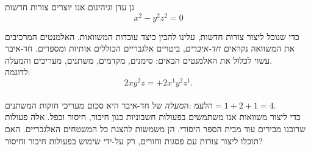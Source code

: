 \begin{surferPage}{גן עדן וגיהינום}
אנו יוצרים צורות חדשות \\
\smallskip
\[x^2	- y^2z^2	= 0\]

\singlespacing
כדי שנוכל ליצור צורות חדשות, עלינו להבין כיצד עובדות המשוואות. האלמנטים המרכיבים את המשוואה נקראים {\it חד-איברים}, ביטויים אלגבריים הכוללים אותיות ומספרים.
\singlespacing
חד-איבר עשוי לכלול את האלמנטים הבאים:
סימנים, מקדמים, משתנים, מעריכים והמעלה.\\
\singlespacing
לדוגמה: 
\smallskip
\[2xy^2z = +2x^1y^2z^1.\]
\\
\smallskip
ה{\it מעלה} של חד-איבר היא סכום מעריכי חזקות המשתנים: $מעלה = 1+2+1=4$.  \\
\singlespacing
כדי ליצור משוואות אנו משתמשים בפעולות חשבוניות כגון חיבור, חיסור וכפל. אלה פעולות שרובנו מכירים עוד מבית הספר היסודי. הן משמשות להצגת כל המשטחים האלגבריים.
\singlespacing
האם תוכלו ליצור צורות עם פסגות וחורים, רק על-ידי שימוש בפעולות חיבור וחיסור?
\end{surferPage}
